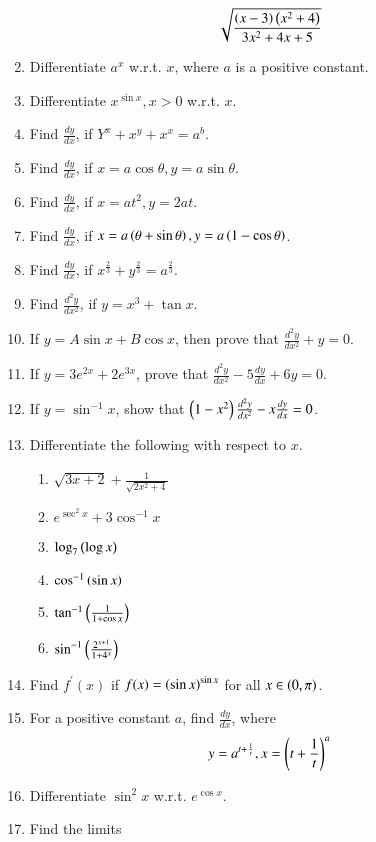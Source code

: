 \begin{enumerate}[label=\arabic*.,ref=\thesubsection.\theenumi]
%
\begin{align}
\sqrt{\frac{\left(x-3\right)\left(x^2+4\right)}{3x^2+4x+5}}
\end{align}
\item Differentiate $a^x$ w.r.t. $x$, where $a$ is a positive constant.
\item Differentiate $x^{\sin x}, x > 0$ w.r.t. $x$.
\item Find $\frac{dy}{dx}$, if $Y^x+x^y+x^x = a^b$.
\item Find $\frac{dy}{dx}$, if $x = a \cos \theta, y = a\sin \theta$.
\item Find $\frac{dy}{dx}$, if $x = a t^2, y = 2at$.
\item Find $\frac{dy}{dx}$, if $x = a \left(\theta+\sin \theta\right), y = a\left(1-\cos \theta\right)$.
\item Find $\frac{dy}{dx}$, if $x^{\frac{2}{3}}+y^{\frac{2}{3}} = a^{\frac{2}{3}}$.
\item Find $\frac{d^2y}{dx^2}$, if $y = x^3+\tan x$.
\item If $y = A \sin x + B \cos x$, then prove that  $\frac{d^2y}{dx^2} + y = 0$.
\item If $y = 3e^{2x}+2e^{3x}$, prove that $\frac{d^2y}{dx^2} - 5\frac{dy}{dx}+6y = 0$.
\item If $y = \sin ^{-1}x$, show that $\left(1-x^2\right)\frac{d^2y}{dx^2} - x\frac{dy}{dx} = 0$.
\item Differentiate the following with respect to $x$.
%
\begin{enumerate}
\item  $\sqrt{3x+2}+ \frac{1}{\sqrt{2x^2+4}}$
\item  $e^{\sec^2 x} + 3\cos^{-1} x$
\item $\log_7\left(\log x\right)$
\item $\cos ^{-1}\left(\sin x\right)$
\item $\tan ^{-1}\left(\frac{1}{1+\cos x}\right)$
\item $\sin^{-1}\left(\frac{2^{x+1}}{1+4^x}\right)$
\end{enumerate}
%
\item Find $f^{\prime}(x)$ if $f(x) = \left(\sin x\right)^{\sin x}$ for all $x \in \left(0, \pi\right)$.
\item For a positive constant $a$, find $\frac{dy}{dx}$, where 
%
\begin{align}
y = a^{t + \frac{1}{t}}, x = \left(t + \frac{1}{t}\right)^a
\end{align}
%
\item Differentiate $\sin ^2 x$ w.r.t. $e^{\cos x}$.
\item Find the limits 

\end{enumerate}
